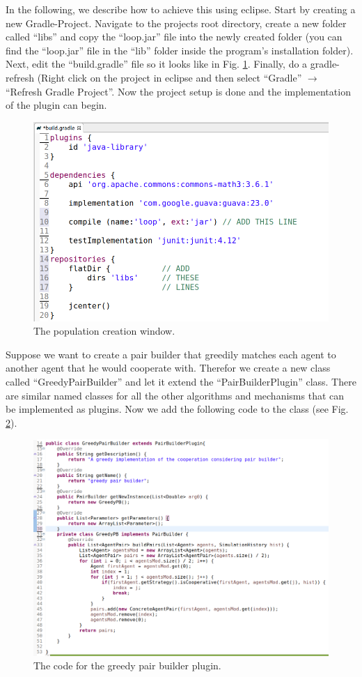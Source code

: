 \documentclass[parskip=full,11pt]{scrartcl}
\begin{document}
In the following, we describe how to achieve this using eclipse. Start by creating a new Gradle-Project. Navigate to the projects root directory, create a new folder called \enquote{libs} and copy the \enquote{loop.jar} file into the newly created folder (you can find the \enquote{loop.jar} file in the \enquote{lib} folder inside the program's installation folder). Next, edit the \enquote{build.gradle} file so it looks like in Fig. \ref{fig:build_gradle}. Finally, do a gradle-refresh (Right click on the project in eclipse and then select \enquote{Gradle} \(\rightarrow\) \enquote{Refresh Gradle Project}. Now the project setup is done and the implementation of the plugin can begin.

\begin{figure} [hbt]
	\centering
	\includegraphics[width=0.8\linewidth]{img_manual/edit_gradle.png}
	\caption{The population creation window.}
	\label{fig:build_gradle}
\end{figure}

Suppose we want to create a pair builder that greedily matches each agent to another agent that he would cooperate with. Therefor we create a new class called \enquote{GreedyPairBuilder} and let it extend the \enquote{PairBuilderPlugin} class. There are similar named classes for all the other algorithms and mechanisms that can be implemented as plugins. Now we add the following code to the class (see Fig. \ref{fig:impl}).

\begin{figure} [hbt]
	\centering
	\includegraphics[width=0.8\linewidth]{img_manual/implementation.png}
	\caption{The code for the greedy pair builder plugin.}
	\label{fig:impl}
\end{figure}
\end{document}
